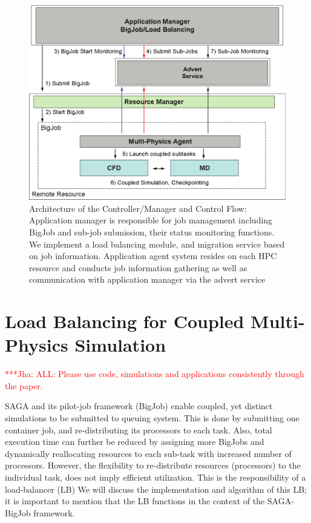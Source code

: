 \documentclass[conference,final]{IEEEtran}
\newcommand{\jhanote}[1]{ {\textcolor{red} { ***Jha: #1 }}}
\newcommand{\jhanote}[1]{}
\begin{document}
\begin{figure}
\centering
\includegraphics[scale=0.38]{Structure_of_BigJob}
\caption{\small Architecture of the Controller/Manager and Control Flow: Application manager is responsible for job management including BigJob and sub-job submission, their status monitoring functions. We implement a load balancing module, and migration service based on job information. Application agent system resides on each HPC resource and conducts job information gathering as well as communication with application manager via the advert service}
\label{Fig:BigJob_Structure}
\end{figure}



\section{Load Balancing for Coupled Multi-Physics Simulation}

\jhanote{ALL: Please use code, simulations and applications
  consistently through the paper.}

SAGA and its pilot-job framework (BigJob) enable coupled, yet distinct
simulations to be submitted to queuing system. This is done by submitting one container
job, and re-distributing its processors to each task. Also, total
execution time can further be reduced by assigning more BigJobs and
dynamically reallocating resources to each sub-task with increased
number of processors. However, the flexibility to re-distribute
resources (processors) to the individual task, does not imply
efficient utilization. This is the responsibility of a load-balancer
(LB) We will discuss the implementation and algorithm of this LB; it
is important to mention that the LB functions in the context of the
SAGA-BigJob framework.
\end{document}
